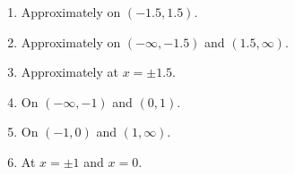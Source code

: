 {%
\begin{minipage}{\linewidth}\end{minipage}
}
{	\begin{enumerate}
\item		Approximately on $(-1.5,1.5)$.
\item		Approximately on $(-\infty,-1.5)$ and $ (1.5,\infty)$.
\item		Approximately at $x=\pm 1.5$.
\item		On $(-\infty,-1)$ and $(0,1)$.
\item		On $(-1,0)$ and $(1,\infty)$.
\item		At $x=\pm 1$ and $x=0$.
\end{enumerate}
}
